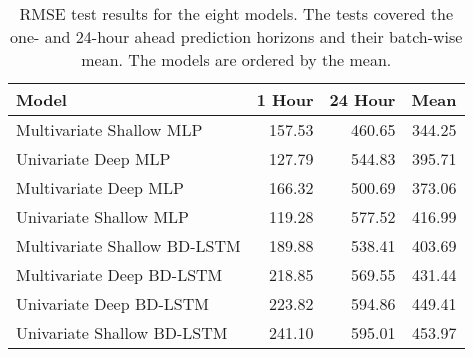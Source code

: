 \begin{table}[H]
\centering
\begin{tabular}{lrrr}
\toprule
Model & 1 Hour & 24 Hour & Mean \\
\midrule
Multivariate Shallow MLP & 157.53 & 460.65 & 344.25 \\
Univariate Deep MLP & 127.79 & 544.83 & 395.71 \\
Multivariate Deep MLP & 166.32 & 500.69 & 373.06 \\
Univariate Shallow MLP & 119.28 & 577.52 & 416.99 \\
Multivariate Shallow BD-LSTM & 189.88 & 538.41 & 403.69 \\
Multivariate Deep BD-LSTM & 218.85 & 569.55 & 431.44 \\
Univariate Deep BD-LSTM & 223.82 & 594.86 & 449.41 \\
Univariate Shallow BD-LSTM & 241.10 & 595.01 & 453.97 \\
\bottomrule
\end{tabular}
\caption{RMSE test results for the eight models. The tests covered the one- and 24-hour ahead prediction horizons and their batch-wise mean. The models are ordered by the mean.}
\label{rmse}
\end{table}
